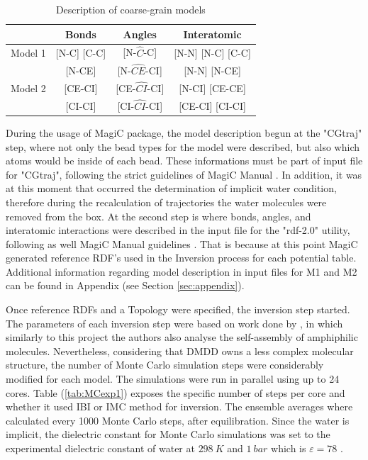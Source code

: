 \documentclass[10pt,a4paper,twoside]{article}
\begin{document}
 \begin{table}[ht!] 
  \centering
\begin{threeparttable}

  \caption{Description of coarse-grain models}

    \begin{tabular}{c|c|c|c}
    \toprule
    &  Bonds & Angles & Interatomic \\
    \midrule
    Model 1   & [N-C] [C-C]  & [N-$\widehat{C}$-C]  & [N-N] [N-C] [C-C]  \\
    \midrule
      			& [N-CE]  & [N-$\widehat{CE}$-CI]  & [N-N] [N-CE]   \\
      Model 2	& [CE-CI] &  [CE-$\widehat{CI}$-CI] &  [N-CI] [CE-CE]   \\
     			 & [CI-CI]  &  [CI-$\widehat{CI}$-CI] &  [CE-CI] [CI-CI]  \\
    \bottomrule
    \end{tabular}%
  \label{tab:potdes}%
\end{threeparttable} 
\end{table}

 During the usage of MagiC package, the model description begun at the "CGtraj" step, where  not only the bead types for the model were described, but also which atoms would be inside of each bead. These informations must be part of input file for "CGtraj", following the strict guidelines of MagiC Manual \cite{magicmanu}. In addition, it was at this moment that occurred the determination of implicit water condition, therefore during the recalculation of trajectories the water molecules were removed from the box. At the second step is where bonds, angles, and interatomic interactions were described in the input file for the "rdf-2.0" utility, following as well MagiC Manual guidelines \cite{magicmanu}.  That is because at this point MagiC generated reference RDF's used in the Inversion process for each potential table. Additional information regarding model description in input files for M1 and M2 can be found in Appendix (see Section \ref{sec:appendix}).
 
 Once reference RDFs and a Topology were specified, the inversion step started. The parameters of each inversion step were based on work done by , in which similarly to this project the authors also analyse the self-assembly of amphiphilic molecules. Nevertheless, considering that DMDD owns a less complex molecular structure, the number of Monte Carlo simulation steps were considerably modified for each model. The simulations were run in parallel using up to 24 cores. Table (\ref{tab:MCexp1}) exposes the specific number of steps per core and whether it used IBI or IMC method for inversion. The ensemble  averages where calculated every 1000 Monte Carlo steps, after equilibration. Since the water is implicit, the dielectric constant for Monte Carlo simulations was set to the experimental dielectric constant of water at $298\ K$ and $1\ bar$ which is $\varepsilon = 78$ \cite{dconst}. 
 
\end{document}
